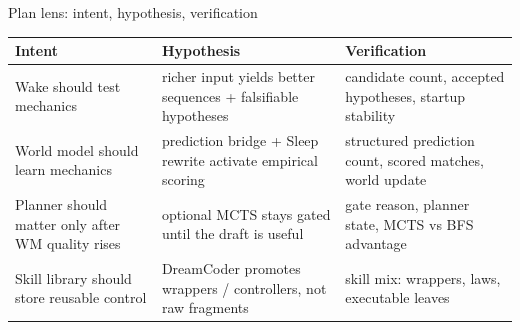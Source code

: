 \documentclass[aspectratio=169]{beamer}
\begin{document}
\begin{frame}{Plan lens: intent, hypothesis, verification}
\scriptsize
\centering
\begin{tabular}{p{} p{} p{}}
\toprule
\textbf{Intent} & \textbf{Hypothesis} & \textbf{Verification} \\
\midrule
Wake should test mechanics & richer input yields better sequences + falsifiable hypotheses & candidate count, accepted hypotheses, startup stability \\
World model should learn mechanics & prediction bridge + Sleep rewrite activate empirical scoring & structured prediction count, scored matches, world update \\
Planner should matter only after WM quality rises & optional MCTS stays gated until the draft is useful & gate reason, planner state, MCTS vs BFS advantage \\
Skill library should store reusable control & DreamCoder promotes wrappers / controllers, not raw fragments & skill mix: wrappers, laws, executable leaves \\
\bottomrule
\end{tabular}
\end{frame}
\end{document}
